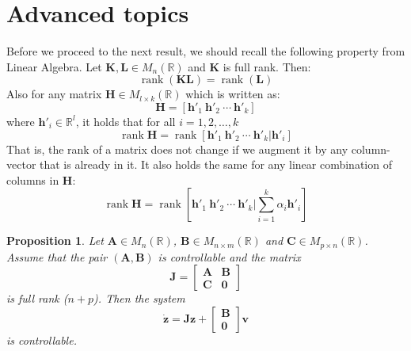 \documentclass[a4paper,10pt,oneside]{book}
\newtheorem{proposition}[theorem]{Proposition}
\begin{document}
\section{Advanced topics}
Before we proceed to the next result, we should recall the following property from Linear Algebra. Let $\mathbf{K},\mathbf{L} \in M_{n}(\mathbb{R})$ and $\mathbf{K}$ is full rank. Then:
\begin{equation}
 \operatorname{rank}(\mathbf{KL})=\operatorname{rank}(\mathbf{L})\label{PRO-Alg1}
\end{equation}
Also for any matrix $\mathbf{H}\in M_{l \times k}(\mathbb{R})$ which is written as:
\begin{equation}
 \mathbf{H}=[\mathbf{h}'_1\ \mathbf{h}'_2\ \cdots\  \mathbf{h}'_k]
\end{equation}
where $\mathbf{h}'_i \in \mathbb{R}^l$, it holds that for all $i=1,2,\ldots,k$
\begin{equation}
 \operatorname{rank}\mathbf{H}=\operatorname{rank}[\mathbf{h}'_1\ \mathbf{h}'_2\ \cdots\  \mathbf{h}'_k | \mathbf{h}'_i]
\end{equation}
That is, the rank of a matrix does not change if we augment it by any column-vector that is already in it. It also holds the same for any linear combination of columns in $\mathbf{H}$:
\begin{equation}
 \operatorname{rank}\mathbf{H}=\operatorname{rank}[\mathbf{h}'_1\ \mathbf{h}'_2\ \cdots\  \mathbf{h}'_k | \sum_{i=1}^k\alpha_i\mathbf{h}'_i]
\end{equation}
\begin{proposition}
 Let $\mathbf{A}\in M_n(\mathbb{R})$, $\mathbf{B}\in M_{n \times m}(\mathbb{R})$ and $\mathbf{C}\in M_{p \times n}(\mathbb{R})$. Assume that the pair $(\mathbf{A},\mathbf{B})$ is controllable and the matrix
\begin{equation}
 \mathbf{J}=\left[ {\begin{array}{cc}\mathbf{A} & \mathbf{B}  \\ \mathbf{C} & \mathbf{0}  \end{array} } \right]\label{JDEF}
\end{equation}
is full rank ($n+p$). Then the system
\begin{equation}
 \dot{\mathbf{z}}=\mathbf{Jz}+\left[ {\begin{array}{c}\mathbf{B}  \\ \mathbf{0}  \end{array} } \right]\mathbf{v}
\end{equation}
is controllable.
\end{proposition}
\end{document}
